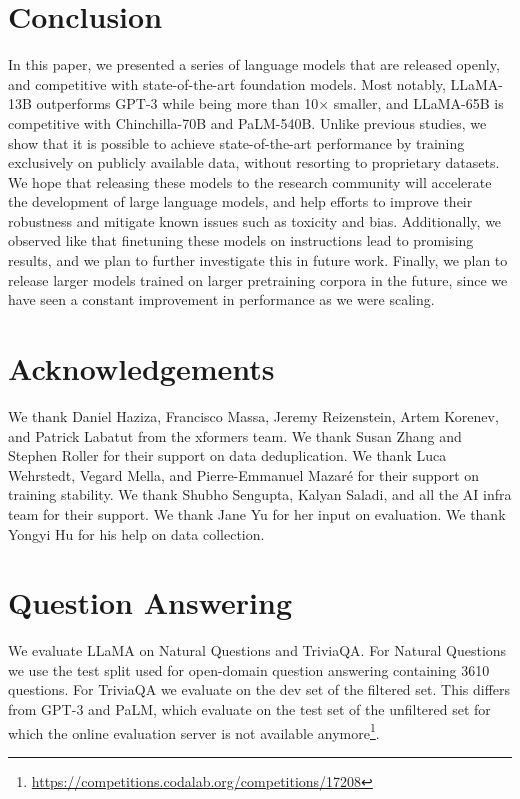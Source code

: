 \documentclass[11pt]{article}
\newcommand{\model}{LLaMA\xspace}%
\begin{document}
\section{Conclusion}

 In this paper, we presented a series of language models that are released openly, and competitive with state-of-the-art foundation models. Most notably, \model-13B outperforms GPT-3 while being more than 10$\times$ smaller, and \model-65B is competitive with Chinchilla-70B and PaLM-540B. Unlike previous studies, we show that it is possible to achieve state-of-the-art performance by training exclusively on publicly available data, without resorting to proprietary datasets.
We hope that releasing these models to the research community will accelerate the development of large language models, and help efforts to improve their robustness and mitigate known issues such as toxicity and bias.
Additionally, we observed like \citet{Chung2022ScalingIL} that finetuning these models on instructions lead to promising results, and we plan to further investigate this in future work.
Finally, we plan to release larger models trained on larger pretraining corpora in the future, since we have seen a constant improvement in performance as we were scaling.



\section*{Acknowledgements}
 We thank Daniel Haziza, Francisco Massa, Jeremy Reizenstein, Artem Korenev, and Patrick Labatut from the xformers team.
We thank Susan Zhang and Stephen Roller for their support on data deduplication.
We thank Luca Wehrstedt, Vegard Mella, and Pierre-Emmanuel Mazaré for their support on training stability.
We thank Shubho Sengupta, Kalyan Saladi, and all the AI infra team for their support.
We thank Jane Yu for her input on evaluation.
We thank Yongyi Hu for his help on data collection.





\clearpage
\appendix
\onecolumn
{}  %


\section{Question Answering}
We evaluate \model on Natural Questions and TriviaQA.
For Natural Questions we use the test split used for open-domain question answering containing 3610 questions.
For TriviaQA we evaluate on the dev set of the filtered set.
This differs from GPT-3 and PaLM, which evaluate on the test set of the unfiltered set for which the online evaluation server is not available anymore\footnote{\url{https://competitions.codalab.org/competitions/17208}}.
\end{document}
